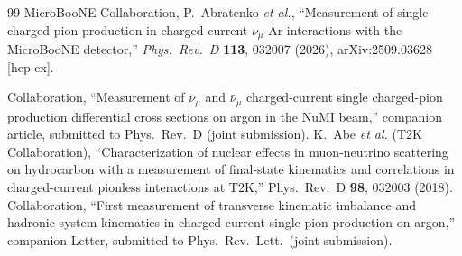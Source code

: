 \begin{thebibliography}{99}
  MicroBooNE Collaboration, P.~Abratenko \textit{et al.},
  ``Measurement of single charged pion production in charged-current
  $\nu_\mu$-Ar interactions with the MicroBooNE detector,''
  \textit{Phys.\ Rev.\ D} \textbf{113}, 032007 (2026),
  arXiv:2509.03628 [hep-ex].


 \uboone{} Collaboration, ``Measurement of $\nu_\mu$ and $\bar\nu_\mu$
  charged-current single charged-pion production differential cross sections on argon in the NuMI
  beam,'' companion article, submitted to Phys.\ Rev.\ D (joint submission).
 K.~Abe \emph{et al.} (T2K Collaboration), ``Characterization of nuclear effects
  in muon-neutrino scattering on hydrocarbon with a measurement of final-state kinematics and
  correlations in charged-current pionless interactions at T2K,'' Phys.\ Rev.\ D \textbf{98},
  032003 (2018).
 \uboone{} Collaboration, ``First measurement of transverse kinematic
  imbalance and hadronic-system kinematics in charged-current single-pion production on argon,''
  companion Letter, submitted to Phys.\ Rev.\ Lett.\ (joint submission).
\end{thebibliography}
